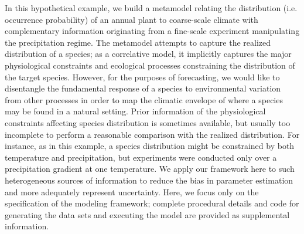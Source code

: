 \documentclass[11pt]{article}
\begin{document}
In this hypothetical example, we build a metamodel relating the distribution (i.e. occurrence probability) of an annual plant to coarse-scale climate with complementary information originating from a fine-scale experiment manipulating the precipitation regime.
The metamodel attempts to capture the realized distribution of a species; as a correlative model, it implicitly captures the major physiological constraints and ecological processes constraining the distribution of the target species. 
However, for the purposes of forecasting, we would like to disentangle the fundamental response of a species to environmental variation from other processes in order to map the climatic envelope of where a species may be found in a natural setting. 
Prior information of the physiological constraints affecting species distribution is sometimes available, but usually too incomplete to perform a reasonable comparison with the realized distribution.
For instance, as in this example, a species distribution might be constrained by both temperature and precipitation, but experiments were conducted only over a precipitation gradient at one temperature. 
We apply our framework here to such heterogeneous sources of information to reduce the bias in parameter estimation and more adequately represent uncertainty. 
Here, we focus only on the specification of the modeling framework; complete procedural details and code for generating the data sets and executing the model are provided as supplemental information.
\end{document}
